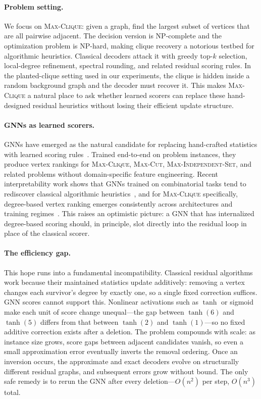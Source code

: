 \documentclass[11pt]{article}
\theoremstyle{plain}
\theoremstyle{remark}
\theoremstyle{plain}
\begin{document}
\paragraph{Problem setting.}
We focus on \textsc{Max-Clique}: given a graph, find the largest subset of vertices
that are all pairwise adjacent. The decision version is NP-complete and the
optimization problem is NP-hard, making clique recovery a notorious testbed for
algorithmic heuristics. Classical decoders attack it with greedy top-$k$ selection,
local-degree refinement, spectral rounding, and related residual scoring rules. In
the planted-clique setting used in our experiments, the clique is hidden inside a
random background graph and the decoder must recover it. This makes
\textsc{Max-Clique} a natural place to ask whether learned scorers can replace these
hand-designed residual heuristics without losing their efficient update structure.

\paragraph{GNNs as learned scorers.}
GNNs have emerged as the natural candidate for replacing hand-crafted statistics
with learned scoring rules~\citep{karalias2020, min2022, garmendia2024}. Trained
end-to-end on problem instances, they produce vertex rankings for \textsc{Max-Clique},
\textsc{Max-Cut}, \textsc{Max-Independent-Set}, and related problems without
domain-specific feature engineering. Recent interpretability work shows that GNNs
trained on combinatorial tasks tend to rediscover classical algorithmic
heuristics~\citep{cappart2023}, and for \textsc{Max-Clique} specifically, degree-based
vertex ranking emerges consistently across architectures and training
regimes~\citep{shoham2026ltr}. This raises an optimistic picture: a GNN that has
internalized degree-based scoring should, in principle, slot directly into the
residual loop in place of the classical scorer.

\paragraph{The efficiency gap.}
This hope runs into a fundamental incompatibility. Classical residual algorithms work
because their maintained statistics update additively: removing a vertex changes each
survivor's degree by exactly one, so a single fixed correction suffices. GNN scores
cannot support this. Nonlinear activations such as $\tanh$ or sigmoid make each unit
of score change unequal---the gap between $\tanh(6)$ and $\tanh(5)$ differs from that
between $\tanh(2)$ and $\tanh(1)$---so no fixed additive correction exists after a
deletion. The problem compounds with scale: as instance size grows, score gaps between
adjacent candidates vanish, so even a small approximation error eventually inverts the
removal ordering. Once an inversion occurs, the approximate and exact decoders evolve
on structurally different residual graphs, and subsequent errors grow without bound.
The only safe remedy is to rerun the GNN after every deletion---$O(n^2)$ per step,
$O(n^3)$ total.
\end{document}
